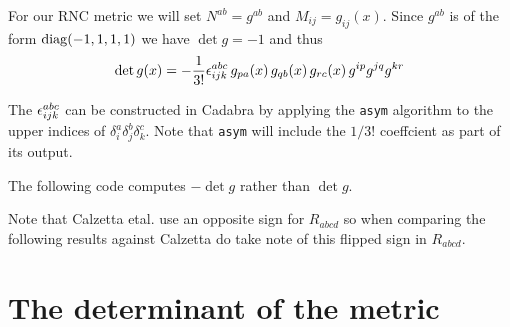 \documentclass[12pt]{cdblatex}
\begin{document}
For our RNC metric we will set $N^{ab} = g^{ab}$ and $M_{ij} = g_{ij}(x)$. Since $g^{ab}$ is
of the form ${\rm diag}(-1,1,1,1)$ we have $\det g = -1$ and thus
\begin{align}
   \det g(x) = - \frac{1}{3!} \epsilon^{abc}_{ijk}\, g_{pa}(x)\, g_{qb}(x)\, g_{rc}(x)\, g^{ip} g^{jq} g^{kr}
\end{align}

The $\epsilon^{abc}_{ijk}$ can be constructed in Cadabra by applying the \verb|asym| algorithm
to the upper indices of $\delta^a_i \delta^b_j \delta^c_k$. Note that \verb|asym| will
include the $1/3!$ coeffcient as part of its output.

The following code computes $-\det g$ rather than $\det g$.

Note that Calzetta etal. use an opposite sign for $R_{abcd}$ so when comparing the following
results against Calzetta do take note of this flipped sign in $R_{abcd}$.

\clearpage

\section*{The determinant of the metric}
\end{document}

